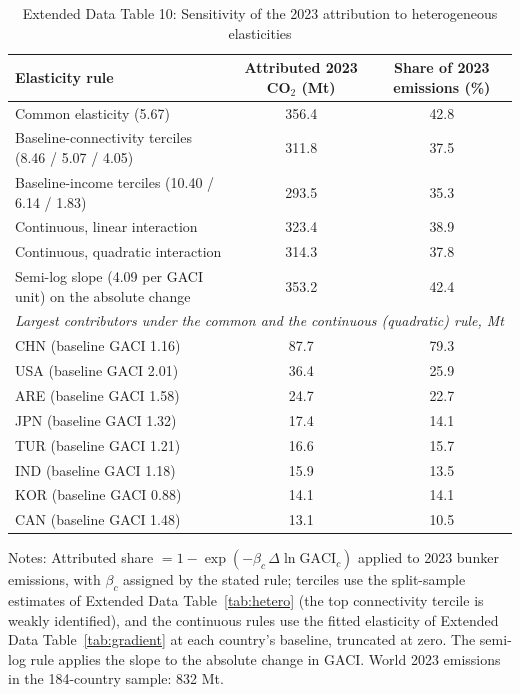 \documentclass[12pt]{article}
\begin{document}
\begin{table}[htbp]
\centering
\begin{threeparttable}
\caption{Extended Data Table 10: Sensitivity of the 2023 attribution to heterogeneous elasticities}
\label{tab:attr_sens}
\footnotesize
\begin{tabular}{lcc}
\toprule
Elasticity rule & Attributed 2023 CO$_2$ (Mt) & Share of 2023 emissions (\%) \\
\midrule
  Common elasticity (5.67) & 356.4 & 42.8 \\
  Baseline-connectivity terciles (8.46 / 5.07 / 4.05) & 311.8 & 37.5 \\
  Baseline-income terciles (10.40 / 6.14 / 1.83) & 293.5 & 35.3 \\
  Continuous, linear interaction & 323.4 & 38.9 \\
  Continuous, quadratic interaction & 314.3 & 37.8 \\
  Semi-log slope (4.09 per GACI unit) on the absolute change & 353.2 & 42.4 \\
\midrule
\multicolumn{3}{l}{\textit{Largest contributors under the common and the continuous (quadratic) rule, Mt}} \\
  CHN (baseline GACI 1.16) & 87.7 & 79.3 \\
  USA (baseline GACI 2.01) & 36.4 & 25.9 \\
  ARE (baseline GACI 1.58) & 24.7 & 22.7 \\
  JPN (baseline GACI 1.32) & 17.4 & 14.1 \\
  TUR (baseline GACI 1.21) & 16.6 & 15.7 \\
  IND (baseline GACI 1.18) & 15.9 & 13.5 \\
  KOR (baseline GACI 0.88) & 14.1 & 14.1 \\
  CAN (baseline GACI 1.48) & 13.1 & 10.5 \\
\bottomrule
\end{tabular}
\begin{tablenotes}[flushleft]
\footnotesize
\item Notes: Attributed share $= 1-\exp(-\beta_c\,\Delta\ln\mathrm{GACI}_c)$ applied to 2023 bunker emissions, with $\beta_c$ assigned by the stated rule; terciles use the split-sample estimates of Extended Data Table~\ref{tab:hetero} (the top connectivity tercile is weakly identified), and the continuous rules use the fitted elasticity of Extended Data Table~\ref{tab:gradient} at each country's baseline, truncated at zero. The semi-log rule applies the slope to the absolute change in GACI. World 2023 emissions in the 184-country sample: 832 Mt.
\end{tablenotes}
\end{threeparttable}
\end{table}
\end{document}

